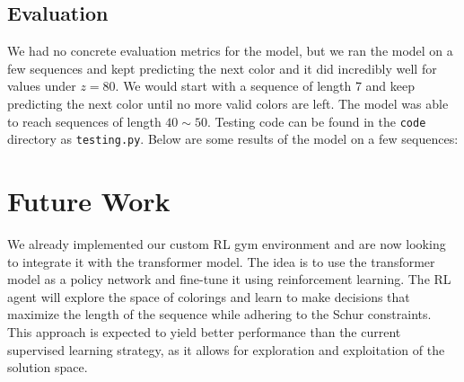 \documentclass[12pt]{article}
\begin{document}
\subsection{Evaluation}
We had no concrete evaluation metrics for the model, but we ran the model on a few sequences and kept predicting the next color and it did incredibly well for values under $z = 80$. We would start with a sequence of length 7 and keep predicting the next color until no more valid colors are left. The model was able to reach sequences of length $40\sim50$. Testing code can be found in the \texttt{code} directory as \texttt{testing.py}.
Below are some results of the model on a few sequences:


\section{Future Work}
We already implemented our custom RL gym environment and are now looking to integrate it with the transformer model. The idea is to use the transformer model as a policy network and fine-tune it using reinforcement learning. The RL agent will explore the space of colorings and learn to make decisions that maximize the length of the sequence while adhering to the Schur constraints. This approach is expected to yield better performance than the current supervised learning strategy, as it allows for exploration and exploitation of the solution space. 
\end{document}
